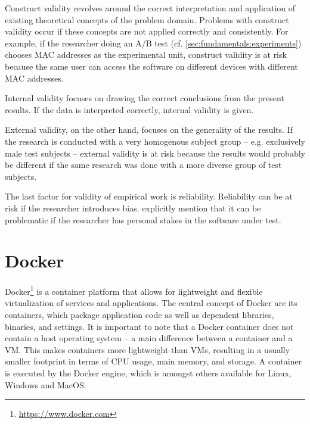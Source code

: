 Construct validity revolves around the correct interpretation and application of existing theoretical concepts of the problem domain.
Problems with construct validity occur if these concepts are not applied correctly and consistently.
For example, if the researcher doing an A/B test (cf. \cref{sec:fundamentals:experiments}) chooses MAC addresses as the experimental unit, construct validity is at risk because the same user can access the software on different devices with different MAC addresses.

Internal validity focuses on drawing the correct conclusions from the present results.
If the data is interpreted correctly, internal validity is given.

External validity, on the other hand, focuses on the generality of the results.
If the research is conducted with a very homogenous subject group -- e.g. exclusively male test subjects -- external validity is at risk because the results would probably be different if the same research was done with a more diverse group of test subjects.

The last factor for validity of empirical work is reliability.
Reliability can be at risk if the researcher introduces bias.
\citeauthor{Easterbrook2008} explicitly mention that it can be problematic if the researcher has personal stakes in the software under test.

\section{Docker}
\label{sec:fundamentals:docker}

Docker\footnote{\url{https://www.docker.com}} is a container platform that allows for lightweight and flexible virtualization of services and applications.
The central concept of Docker are its containers, which package application code as well as dependent libraries, binaries, and settings.
It is important to note that a Docker container does not contain a host operating system -- a main difference between a container and a \ac{VM}.
This makes containers more lightweight than \ac{VM}s, resulting in a usually smaller footprint in terms of CPU usage, main memory, and storage.
A container is executed by the Docker engine, which is amongst others available for Linux, Windows and MacOS.

